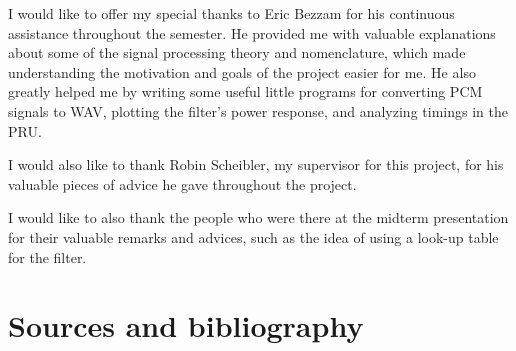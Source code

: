 \documentclass[]{report}
\begin{document}
I would like to offer my special thanks to Eric Bezzam for his continuous assistance throughout the semester. He provided me with valuable explanations about some of the signal processing theory and nomenclature, which made understanding the motivation and goals of the project easier for me. He also greatly helped me by writing some useful little programs for converting PCM signals to WAV, plotting the filter's power response, and analyzing timings in the PRU.

I would also like to thank Robin Scheibler, my supervisor for this project, for his valuable pieces of advice he gave throughout the project.

I would like to also thank the people who were there at the midterm presentation for their valuable remarks and advices, such as the idea of using a look-up table for the filter.

\hypertarget{sources-and-bibliography}{%
\chapter*{Sources and bibliography}\label{sources-and-bibliography}}
\end{document}

